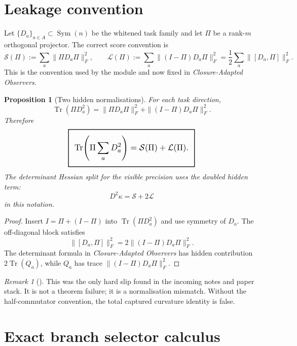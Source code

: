 \documentclass[11pt,a4paper]{article}
\numberwithin{equation}{section}
\DeclareMathOperator{\Tr}{Tr}
\DeclareMathOperator{\Sym}{Sym}
\newcommand{\geomboxed}[1]{%
  \setlength{\fboxsep}{8pt}%
  \setlength{\fboxrule}{0.9pt}%
  \fbox{\scalebox{1.18}{$\displaystyle #1$}}%
}
\theoremstyle{thmcompact}
\newtheorem{proposition}[theorem]{Proposition}
\theoremstyle{remark}
\newtheorem*{remarkplain}{Remark}
\newenvironment{remark}[1][]%
{\begin{remarkbox}\begin{remarkplain}[#1]\normalfont}
{\end{remarkplain}\end{remarkbox}}
\begin{document}
\section{Leakage convention}

Let $\{D_a\}_{a\in A}\subset\Sym(n)$ be the whitened task family and let $\Pi$ be a rank-$m$ orthogonal projector. The correct score convention is
\begin{equation}
\mathcal S(\Pi):=\sum_a\|\Pi D_a\Pi\|_F^2,
\qquad
\mathcal L(\Pi):=\sum_a\|(I-\Pi)D_a\Pi\|_F^2
=\frac12\sum_a\|[D_a,\Pi]\|_F^2.
\label{eq:score-convention}
\end{equation}
This is the convention used by the module and now fixed in \emph{Closure-Adapted Observers}.

\begin{proposition}[Two hidden normalisations]
\label{prop:two-hidden-normalisations}
For each task direction,
\begin{equation}
\Tr(\Pi D_a^2)=\|\Pi D_a\Pi\|_F^2+\|(I-\Pi)D_a\Pi\|_F^2.
\label{eq:captured-identity}
\end{equation}
Therefore
\begin{equation}
\geomboxed{\Tr\!\left(\Pi\sum_aD_a^2\right)=\mathcal S(\Pi)+\mathcal L(\Pi).}
\label{eq:captured-score}
\end{equation}
The determinant Hessian split for the visible precision uses the doubled hidden term:
\begin{equation}
D^2\kappa=\mathcal S+2\mathcal L
\label{eq:det-doubled}
\end{equation}
in this notation.
\end{proposition}

\begin{proof}
Insert $I=\Pi+(I-\Pi)$ into $\Tr(\Pi D_a^2)$ and use symmetry of $D_a$. The off-diagonal block satisfies
\[
\|[D_a,\Pi]\|_F^2=2\|(I-\Pi)D_a\Pi\|_F^2.
\]
The determinant formula in \emph{Closure-Adapted Observers} has hidden contribution $2\Tr(Q_a)$, while $Q_a$ has trace $\|(I-\Pi)D_a\Pi\|_F^2$.
\end{proof}

\begin{remark}
This was the only hard slip found in the incoming notes and paper stack. It is not a theorem failure; it is a normalisation mismatch. Without the half-commutator convention, the total captured curvature identity is false.
\end{remark}

\section{Exact branch selector calculus}
\end{document}
